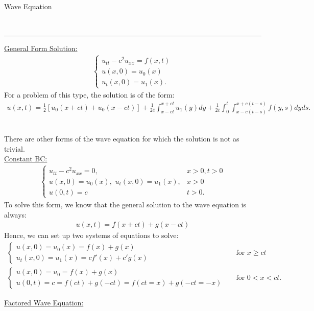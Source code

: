 \documentclass{article}
\newcommand{\header}[1]{\begin{large}\noindent #1\end{large}\\\rule{\textwidth}{0.5pt}}
\newcommand{\sheader}[1]{\underline{#1:}}
\newcommand{\gap}{\medskip\\}
\begin{document}
\header{Wave Equation}

\sheader{General Form Solution}
\begin{align*}
    \begin{cases}
        u_{tt} - c^2 u_{xx} = f(x, t)\\
        u(x, 0) = u_0(x)\\
        u_t(x, 0) = u_1(x).
    \end{cases}
\end{align*}
For a problem of this type, the solution is of the form:
\begin{align*}
    u(x, t) = \frac{1}{2} \left[u_0(x+ct) + u_0(x - ct)\right] + \frac{1}{2c} \int_{x-ct}^{x + ct} u_1(y)dy
    + \frac{1}{2c} \int_{0}^{t}\int_{x-c(t-s)}^{x+c(t-s)}f(y, s)dyds.
\end{align*}
\raggedleft\qedsymbol\\
\raggedright
There are other forms of the wave equation for which the solution is 
not as trivial.\gap
\sheader{Constant BC}
\begin{align*}
    \begin{cases}
        u_{tt} - c^2 u_{xx} = 0, &  x > 0, t > 0\\
        u(x, 0) = u_0(x), \,\, u_t(x, 0) = u_1(x), &  x > 0\\
        u(0, t) = c & t > 0.
    \end{cases}
\end{align*}
To solve this form, we know that the general solution to the wave equation is 
always:
\begin{align*}
    u(x, t) = f(x + ct) + g(x - ct)
\end{align*}
Hence, we can set up two systems of equations to solve:
\begin{align*}
    \begin{cases}
        u(x, 0) = u_0(x) = f(x) + g(x)\\
        u_t(x, 0) = u_1(x) = cf'(x) + c'g(x)
    \end{cases}
    &&
    \textrm{for}\,\, x \geq ct\\
    \begin{cases}
        u(x, 0) = u_0 = f(x) + g(x)\\
        u(0, t) = c = f(ct) + g(-ct) = f(ct=x) + g(-ct = -x) 
    \end{cases} && 
    \textrm{for} \,\, 0 < x < ct.
\end{align*}

\pagebreak

\sheader{Factored Wave Equation}
\end{document}
